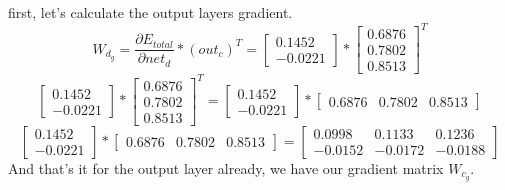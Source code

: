 \documentclass[11pt, halfparskip]{article}
\begin{document}
    first, let's calculate the output layers gradient.
    \[
	W_{d_g} = \frac{\partial E_{total}}{\partial net_d} * (out_c)^T =
	\begin{bmatrix}
    		0.1452\\
    		-0.0221
    	\end{bmatrix}
    	*
    	\begin{bmatrix}
        		0.6876\\
        		0.7802\\
        		0.8513
        	\end{bmatrix}^T
    \]
    \[
    	\begin{bmatrix}
    		0.1452\\
    		-0.0221
    	\end{bmatrix}
    	*
    	\begin{bmatrix}
        		0.6876\\
        		0.7802\\
        		0.8513
        	\end{bmatrix}^T
        	=
        	\begin{bmatrix}
    		0.1452\\
    		-0.0221
    	\end{bmatrix}
    	*
    	\begin{bmatrix}
        		0.6876 & 0.7802 & 0.8513
        	\end{bmatrix}
    \]
    \[
    	\begin{bmatrix}
    		0.1452\\
    		-0.0221
    	\end{bmatrix}
    	*
    	\begin{bmatrix}
        		0.6876 & 0.7802 & 0.8513
        	\end{bmatrix}
        	=
        	\begin{bmatrix}
        		0.0998 & 0.1133 & 0.1236\\
        		-0.0152 & -0.0172 & -0.0188
        	\end{bmatrix}
    \]
    And that's it for the output layer already, we have our gradient matrix $W_{c_g}$.
    
\end{document}
